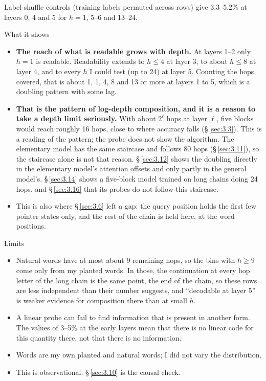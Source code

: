\documentclass[paper=a4,fontsize=11pt,DIV=11,parskip=half,headings=small,numbers=noendperiod]{scrartcl}
\DeclareRobustCommand{\lead}[1]{\textsf{\bfseries\color{accent}#1}}
\begin{document}
Label-shuffle controls (training labels permuted across rows) give 3.3–5.2\% at layers 0, 4 and 5 for $h=1$, 5–6
and 13–24.

\begin{findbox}{What it shows}
\begin{itemize}
\item \lead{The reach of what is readable grows with depth.} At layers 1–2 only $h=1$ is readable. Readability
  extends to $h\le4$ at layer 3, to about $h\le8$ at layer 4, and to every $h$ I could test (up to 24) at layer
  5. Counting the hops covered, that is about 1, 1, 4, 8 and 13 or more at layers 1 to 5, which is a doubling
  pattern with some lag.
\item \lead{That is the pattern of log-depth composition, and it is a reason to take a depth limit seriously.}
  With about $2^\ell$ hops at layer $\ell$, five blocks would reach roughly 16 hops, close to where accuracy
  falls (\S\,\ref{sec:3.3}). This is a reading of the pattern; the probe does not show the algorithm. The
  elementary model has the same staircase and follows 80 hops (\S\,\ref{sec:3.11}), so the staircase alone is
  not that reason. \S\,\ref{sec:3.12} shows the doubling directly in the elementary model’s attention offsets
  and only partly in the general model’s. \S\,\ref{sec:3.14} shows a five-block model trained on long chains
  doing 24 hops, and \S\,\ref{sec:3.16} that its probes do not follow this staircase.
\item This is also where \S\,\ref{sec:3.6} left a gap: the query position holds the first few pointer states
  only, and the rest of the chain is held here, at the word positions.
\end{itemize}
\end{findbox}

\begin{limbox}{Limits}
\begin{itemize}
\item Natural words have at most about 9 remaining hops, so the bins with $h\ge9$ come only from my planted
  words. In those, the continuation at every hop letter of the long chain is the same point, the end of the
  chain, so these rows are less independent than their number suggests, and “decodable at layer 5” is weaker
  evidence for composition there than at small $h$.
\item A linear probe can fail to find information that is present in another form. The values of 3–5\% at the
  early layers mean that there is no linear code for this quantity there, not that there is no information.
\item Words are my own planted and natural words; I did not vary the distribution.
\item This is observational. \S\,\ref{sec:3.10} is the causal check.
\end{itemize}
\end{limbox}
\end{document}
